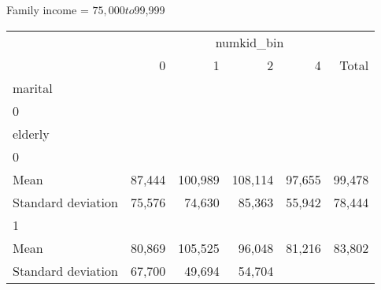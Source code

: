 Family income = $75,000 to $99,999
\begin{tabular}{llllll}
\cline{1-6}
\multicolumn{1}{c}{} &
  \multicolumn{5}{|c}{numkid\_bin} \\
\multicolumn{1}{c}{} &
  \multicolumn{1}{|r}{0} &
  \multicolumn{1}{r}{1} &
  \multicolumn{1}{r}{2} &
  \multicolumn{1}{r}{4} &
  \multicolumn{1}{r}{Total} \\
\cline{1-6}
\multicolumn{1}{l}{marital} &
  \multicolumn{1}{|r}{} &
  \multicolumn{1}{r}{} &
  \multicolumn{1}{r}{} &
  \multicolumn{1}{r}{} &
  \multicolumn{1}{r}{} \\
\multicolumn{1}{l}{\hspace{1em}0} &
  \multicolumn{1}{|r}{} &
  \multicolumn{1}{r}{} &
  \multicolumn{1}{r}{} &
  \multicolumn{1}{r}{} &
  \multicolumn{1}{r}{} \\
\multicolumn{1}{l}{\hspace{2em}elderly} &
  \multicolumn{1}{|r}{} &
  \multicolumn{1}{r}{} &
  \multicolumn{1}{r}{} &
  \multicolumn{1}{r}{} &
  \multicolumn{1}{r}{} \\
\multicolumn{1}{l}{\hspace{3em}0} &
  \multicolumn{1}{|r}{} &
  \multicolumn{1}{r}{} &
  \multicolumn{1}{r}{} &
  \multicolumn{1}{r}{} &
  \multicolumn{1}{r}{} \\
\multicolumn{1}{l}{\hspace{4em}Mean} &
  \multicolumn{1}{|r}{87,444} &
  \multicolumn{1}{r}{100,989} &
  \multicolumn{1}{r}{108,114} &
  \multicolumn{1}{r}{97,655} &
  \multicolumn{1}{r}{99,478} \\
\multicolumn{1}{l}{\hspace{4em}Standard deviation} &
  \multicolumn{1}{|r}{75,576} &
  \multicolumn{1}{r}{74,630} &
  \multicolumn{1}{r}{85,363} &
  \multicolumn{1}{r}{55,942} &
  \multicolumn{1}{r}{78,444} \\
\multicolumn{1}{l}{\hspace{3em}1} &
  \multicolumn{1}{|r}{} &
  \multicolumn{1}{r}{} &
  \multicolumn{1}{r}{} &
  \multicolumn{1}{r}{} &
  \multicolumn{1}{r}{} \\
\multicolumn{1}{l}{\hspace{4em}Mean} &
  \multicolumn{1}{|r}{80,869} &
  \multicolumn{1}{r}{105,525} &
  \multicolumn{1}{r}{96,048} &
  \multicolumn{1}{r}{81,216} &
  \multicolumn{1}{r}{83,802} \\
\multicolumn{1}{l}{\hspace{4em}Standard deviation} &
  \multicolumn{1}{|r}{67,700} &
  \multicolumn{1}{r}{49,694} &
  \multicolumn{1}{r}{54,704} &

\end{tabular}
